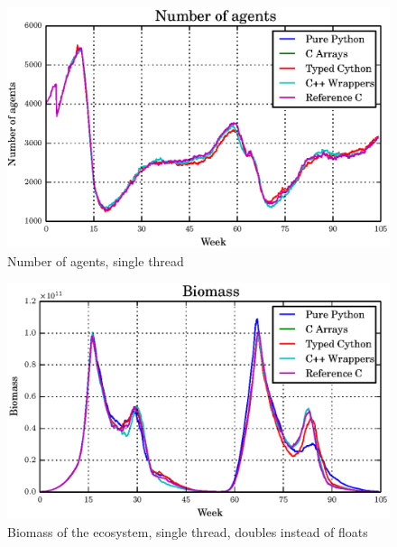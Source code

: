 \documentclass[12pt, a4paper]{report}
\begin{document}
\begin{appendices}
\begin{figure}[H]
  \begin{center}
    \includegraphics[width=\columnwidth]{graphs/ag-fixed-single-float-comp.eps}
    \caption{Number of agents, single thread}
    \label{fig:ag-fixed-single-float-comp}
  \end{center}
\end{figure}

\begin{figure}[H]
  \begin{center}
    \includegraphics[width=\columnwidth]{graphs/bio-fixed-single-double-comp.eps}
    \caption{Biomass of the ecosystem, single thread, doubles instead of floats}
    \label{fig:bio-fixed-single-double-comp}
  \end{center}
\end{figure}


\end{appendices}
\end{document}

